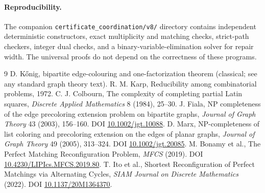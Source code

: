 \documentclass[10pt]{article}
\begin{document}
\paragraph{Reproducibility.} The companion \texttt{certificate\_coordination/v8/} directory contains independent deterministic constructors, exact multiplicity and matching checks, strict-path checkers, integer dual checks, and a binary-variable-elimination solver for repair width. The universal proofs do not depend on the correctness of these programs.

\begin{thebibliography}{9}
 D. K\H{o}nig, bipartite edge-colouring and one-factorization theorem (classical; see any standard graph theory text).
 R. M. Karp, Reducibility among combinatorial problems, 1972.
 C. J. Colbourn, The complexity of completing partial Latin squares, \emph{Discrete Applied Mathematics} 8 (1984), 25--30.
 J. Fiala, NP completeness of the edge precoloring extension problem on bipartite graphs, \emph{Journal of Graph Theory} 43 (2003), 156--160. DOI \href{https://doi.org/10.1002/jgt.10088}{10.1002/jgt.10088}.
 D. Marx, NP-completeness of list coloring and precoloring extension on the edges of planar graphs, \emph{Journal of Graph Theory} 49 (2005), 313--324. DOI \href{https://doi.org/10.1002/jgt.20085}{10.1002/jgt.20085}.
 M. Bonamy et al., The Perfect Matching Reconfiguration Problem, \emph{MFCS} (2019). DOI \href{https://doi.org/10.4230/LIPIcs.MFCS.2019.80}{10.4230/LIPIcs.MFCS.2019.80}.
 T. Ito et al., Shortest Reconfiguration of Perfect Matchings via Alternating Cycles, \emph{SIAM Journal on Discrete Mathematics} (2022). DOI \href{https://doi.org/10.1137/20M1364370}{10.1137/20M1364370}.
\end{thebibliography}
\end{document}
